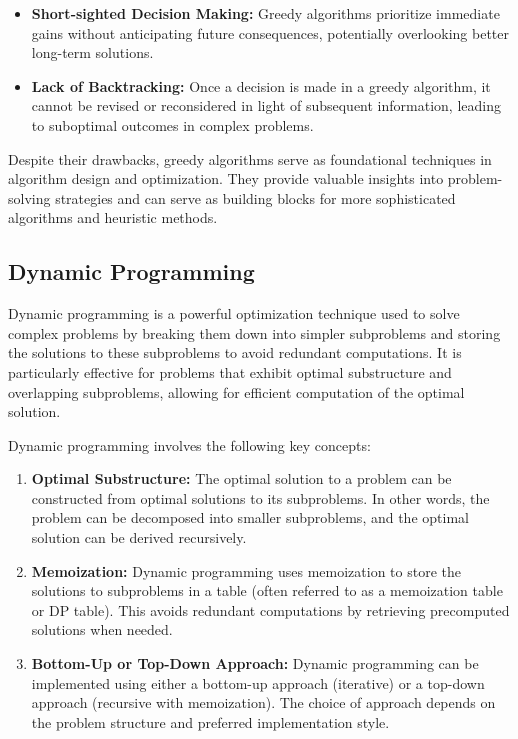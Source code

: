 \documentclass[11pt]{report}
\begin{document}
        \begin{itemize}
            \item \textbf{Short-sighted Decision Making:} Greedy algorithms prioritize immediate gains without anticipating future consequences, potentially overlooking better long-term solutions.
        
            \item \textbf{Lack of Backtracking:} Once a decision is made in a greedy algorithm, it cannot be revised or reconsidered in light of subsequent information, leading to suboptimal outcomes in complex problems.
        \end{itemize}
        
        Despite their drawbacks, greedy algorithms serve as foundational techniques in algorithm design and optimization. They provide valuable insights into problem-solving strategies and can serve as building blocks for more sophisticated algorithms and heuristic methods.
        
        \subsection{Dynamic Programming}
        Dynamic programming is a powerful optimization technique used to solve complex problems by breaking them down into simpler subproblems and storing the solutions to these subproblems to avoid redundant computations. It is particularly effective for problems that exhibit optimal substructure and overlapping subproblems, allowing for efficient computation of the optimal solution.
        
        Dynamic programming involves the following key concepts:

        \begin{enumerate}
            \item \textbf{Optimal Substructure:} The optimal solution to a problem can be constructed from optimal solutions to its subproblems. In other words, the problem can be decomposed into smaller subproblems, and the optimal solution can be derived recursively.
        
            \item \textbf{Memoization:} Dynamic programming uses memoization to store the solutions to subproblems in a table (often referred to as a memoization table or DP table). This avoids redundant computations by retrieving precomputed solutions when needed.
        
            \item \textbf{Bottom-Up or Top-Down Approach:} Dynamic programming can be implemented using either a bottom-up approach (iterative) or a top-down approach (recursive with memoization). The choice of approach depends on the problem structure and preferred implementation style.
        \end{enumerate}
        
\end{document}
